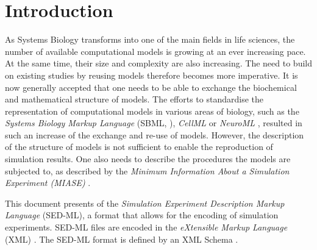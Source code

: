 \chapter{Introduction}

As Systems Biology transforms into one of the main fields in life sciences, the number of available computational models is growing at an ever increasing pace. At the same time, their size and complexity are also increasing. The need to build on existing studies by reusing models therefore becomes more imperative. It is now generally accepted that one needs to be able to exchange the biochemical and mathematical structure of models. The efforts to standardise the representation of computational models in various areas of biology, such as the \emph{Systems Biology Markup Language} (SBML, \citet{Hucka:2003}), \emph{CellML} \citep{Lloyd:2004} or \emph{NeuroML} \citet{Goddard:2001}, resulted in such an increase of the exchange and re-use of models. However, the description of the structure of models is not sufficient to enable the reproduction of simulation results.  One also needs to describe the procedures the models are subjected to, as described by the \emph{Minimum Information About a Simulation Experiment (MIASE)} \citep{Waltemath:2011}. 

This document presents  \LoneVone of the \emph{Simulation Experiment Description Markup Language} (SED-ML), a format that allows for the encoding of simulation experiments. SED-ML files are encoded in the \emph{eXtensible Markup Language} (XML) \citep{Bray:2006}. The SED-ML format is defined by an XML Schema \citep{Fallside:2001}. 






